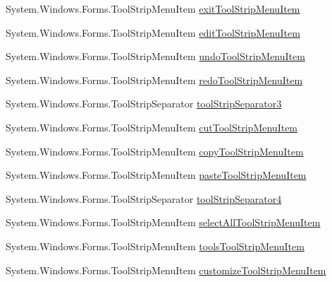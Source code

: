 \begin{DoxyCompactItemize}
\item 
\-System.\-Windows.\-Forms.\-Tool\-Strip\-Menu\-Item \hyperlink{class_sr_p___classroom_inq_1_1frm_classrrom_inq_a676112a698472361a000699f774d38ca}{exit\-Tool\-Strip\-Menu\-Item}
\item 
\-System.\-Windows.\-Forms.\-Tool\-Strip\-Menu\-Item \hyperlink{class_sr_p___classroom_inq_1_1frm_classrrom_inq_a3e1d074025f88cab6f1911c123de6abb}{edit\-Tool\-Strip\-Menu\-Item}
\item 
\-System.\-Windows.\-Forms.\-Tool\-Strip\-Menu\-Item \hyperlink{class_sr_p___classroom_inq_1_1frm_classrrom_inq_a8163a2e440678bc9508520209879805e}{undo\-Tool\-Strip\-Menu\-Item}
\item 
\-System.\-Windows.\-Forms.\-Tool\-Strip\-Menu\-Item \hyperlink{class_sr_p___classroom_inq_1_1frm_classrrom_inq_a1b4d7ae0d344dc1fda1561a1d652fa6c}{redo\-Tool\-Strip\-Menu\-Item}
\item 
\-System.\-Windows.\-Forms.\-Tool\-Strip\-Separator \hyperlink{class_sr_p___classroom_inq_1_1frm_classrrom_inq_ac7f725652d980e8ef92f1119843f02a0}{tool\-Strip\-Separator3}
\item 
\-System.\-Windows.\-Forms.\-Tool\-Strip\-Menu\-Item \hyperlink{class_sr_p___classroom_inq_1_1frm_classrrom_inq_a62b714f774f74f0e4a36f60909cf7d78}{cut\-Tool\-Strip\-Menu\-Item}
\item 
\-System.\-Windows.\-Forms.\-Tool\-Strip\-Menu\-Item \hyperlink{class_sr_p___classroom_inq_1_1frm_classrrom_inq_a945826606f8dc78bfaaa45591619ecfc}{copy\-Tool\-Strip\-Menu\-Item}
\item 
\-System.\-Windows.\-Forms.\-Tool\-Strip\-Menu\-Item \hyperlink{class_sr_p___classroom_inq_1_1frm_classrrom_inq_a6cd3b1f68a59b97544531e749b77e868}{paste\-Tool\-Strip\-Menu\-Item}
\item 
\-System.\-Windows.\-Forms.\-Tool\-Strip\-Separator \hyperlink{class_sr_p___classroom_inq_1_1frm_classrrom_inq_a4b694b6ce3670642d724af5e79c46031}{tool\-Strip\-Separator4}
\item 
\-System.\-Windows.\-Forms.\-Tool\-Strip\-Menu\-Item \hyperlink{class_sr_p___classroom_inq_1_1frm_classrrom_inq_a7e6e1b306acf890605ad11f6aca7fce7}{select\-All\-Tool\-Strip\-Menu\-Item}
\item 
\-System.\-Windows.\-Forms.\-Tool\-Strip\-Menu\-Item \hyperlink{class_sr_p___classroom_inq_1_1frm_classrrom_inq_a89a0ae0ac6568cec51bb828874802c28}{tools\-Tool\-Strip\-Menu\-Item}
\item 
\-System.\-Windows.\-Forms.\-Tool\-Strip\-Menu\-Item \hyperlink{class_sr_p___classroom_inq_1_1frm_classrrom_inq_a3296cc0b41841b3014df5c5759d9e839}{customize\-Tool\-Strip\-Menu\-Item}

\end{DoxyCompactItemize}
